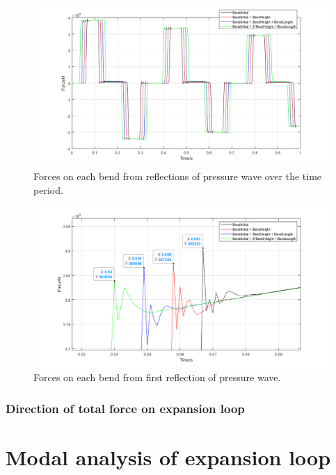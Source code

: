 \begin{figure}[H]
    \centering
    \includegraphics[width = 0.9 \textwidth]{img/fig6.png}
    \caption{Forces on each bend from reflections of pressure wave over the time period.}
    \label{force2}
\end{figure}

\begin{figure}[H]
    \centering
    \includegraphics[width = 0.9 \textwidth]{img/fig5.png}
    \caption{Forces on each bend from first reflection of pressure wave.}
    \label{force1}
\end{figure}

\subsubsection{Direction of total force on expansion loop}
\section{Modal analysis of expansion loop}

